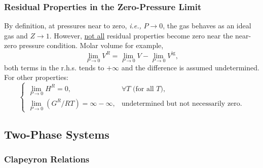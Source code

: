 \documentclass[12pts,a4paper,amsmath,amssymb,floatfix]{article}%
\newcommand{\ie}{{\it i.e., }}
\begin{document}
   \subsubsection{Residual Properties in the Zero-Pressure Limit}
      
       By definition, at pressures near to zero, \ie $P\rightarrow 0$, the gas behaves as an ideal gas and $Z\rightarrow 1$. However, \underline{not all} residual properties become zero near the near-zero pressure condition. Molar volume for example,
       \begin{displaymath}
           \lim\limits_{P\rightarrow 0}V^{R} = \lim\limits_{P\rightarrow 0}V - \lim\limits_{P\rightarrow 0}V^{\text{ig}},
       \end{displaymath}
both terms in the r.h.s. tends to $+\infty$ and the difference is assumed undetermined. For other properties:
       \begin{displaymath}
          \begin{cases}
             \lim\limits_{P\rightarrow 0}H^{R} = 0, & \forall T \text{ (for all $T$)}, \\
             \lim\limits_{P\rightarrow 0}\left(G^{R}/RT\right) = \infty-\infty,& \text{undetermined but not necessarily zero}.  
          \end{cases}
       \end{displaymath}


\subsection{Two-Phase Systems}\label{Section:03:Two_Phase}

   \subsubsection{Clapeyron Relations}\label{Section:03:ClapeyronRelations}
\end{document}
